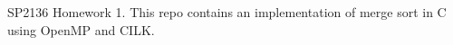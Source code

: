 \label{index_md__home_wivill_git_sp2136_cilk_omp_merge_sort_README}%
%
SP2136 Homework 1. This repo contains an implementation of merge sort in C using Open\+MP and CILK. 